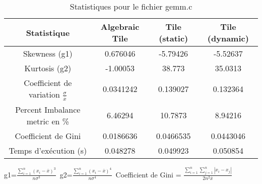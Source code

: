 \documentclass{article}
\begin{document}
\begin{table}[htbp]
  \centering
  \caption{Statistiques pour le fichier gemm.c}
  \begin{tabular}{|c|c|c|c|}
    \hline
    Statistique & Algebraic Tile & Tile (static) & Tile (dynamic) \\ 
    \hline
    Skewness (g1)  & 0.676046 & -5.79426 & -5.52637 \\ 
    Kurtosis (g2)  & -1.00053 & 38.773 & 35.0313 \\ 
    Coefficient de variation $ \frac{\sigma}{\overline{x}} $ & 0.0341242 & 0.139027 & 0.132364\\ 
    Percent Imbalance metric en \% & 6.46294 & 10.7873 & 8.94216\\ 
    Coefficient de Gini  & 0.0186636 & 0.0466535 & 0.0443046\\ 
    Temps d'exécution (s) &  0.048278    &  0.049923   &  0.050854   \\ 

    \hline
  \end{tabular}
\end{table}
g1=$ \frac{\sum_{i=1}^{n} (x_i - \overline{x})^3}{n\sigma^3} $\
g2=$ \frac{\sum_{i=1}^{n} (x_i - \overline{x})^4}{n\sigma^4} $\
Coefficient de Gini = $ \frac{\sum_{i=1}^{n}\sum_{j=1}^{n} |x_i - x_j|}{2n^2\overline{x}} $\
\newpage
\end{document}
